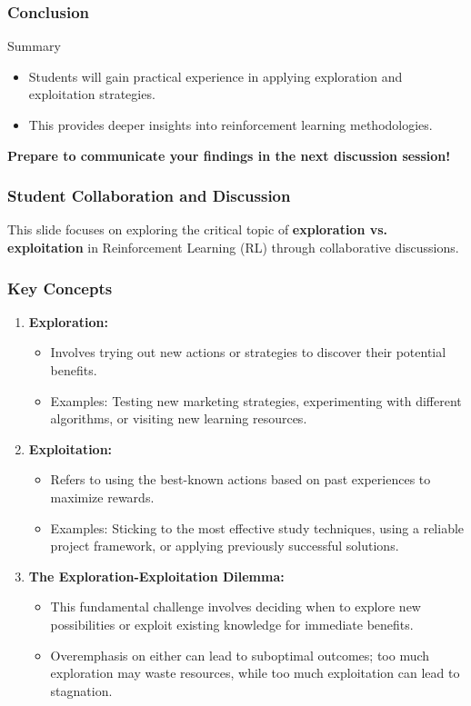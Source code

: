 \documentclass[aspectratio=169]{beamer}
\begin{document}
\begin{frame}[fragile]
    \frametitle{Conclusion}
    \begin{block}{Summary}
        \begin{itemize}
            \item Students will gain practical experience in applying exploration and exploitation strategies.
            \item This provides deeper insights into reinforcement learning methodologies.
        \end{itemize}
        \textbf{Prepare to communicate your findings in the next discussion session!}
    \end{block}
\end{frame}

\begin{frame}[fragile]
    \frametitle{Student Collaboration and Discussion}
    This slide focuses on exploring the critical topic of \textbf{exploration vs. exploitation} in Reinforcement Learning (RL) through collaborative discussions.
\end{frame}

\begin{frame}[fragile]
    \frametitle{Key Concepts}
    \begin{enumerate}
        \item \textbf{Exploration:}
        \begin{itemize}
            \item Involves trying out new actions or strategies to discover their potential benefits.
            \item Examples: Testing new marketing strategies, experimenting with different algorithms, or visiting new learning resources.
        \end{itemize}
        
        \item \textbf{Exploitation:}
        \begin{itemize}
            \item Refers to using the best-known actions based on past experiences to maximize rewards.
            \item Examples: Sticking to the most effective study techniques, using a reliable project framework, or applying previously successful solutions.
        \end{itemize}

        \item \textbf{The Exploration-Exploitation Dilemma:}
        \begin{itemize}
            \item This fundamental challenge involves deciding when to explore new possibilities or exploit existing knowledge for immediate benefits.
            \item Overemphasis on either can lead to suboptimal outcomes; too much exploration may waste resources, while too much exploitation can lead to stagnation.
        \end{itemize}
    \end{enumerate}
\end{frame}
\end{document}
